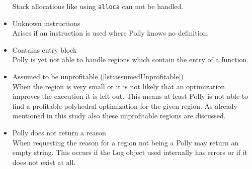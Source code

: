 \begin{itemize}
        Stack allocations like using \texttt{alloca} can not be handled.
    \item Unknown instructions\\
        Arises if an instruction is used where Polly knows no definition.
    \item Contains entry block\\
        Polly is yet not able to handle regions which contain the entry of a function.
    \item Assumed to be unprofitable (\autoref{lst:assumedUnprofitable})\\
        When the region is very small or it is not likely that an optimization improves the execution it is left out.
        This means at least Polly is not able to find a profitable polyhedral optimization for the given region.
        As already mentioned in this study also these unprofitable regions are discussed.
    \item Polly does not return a reason\\
        When requesting the reason for a region not being a \scop Polly may return an empty string.
        This occurs if the Log object used internally has errors or if it does not exist at all.
\end{itemize}

\begin{comment}
    Following is copy\&pasted from pollys ScopDetectionDiagnostic.cpp

SCOP_STAT(CFG, ""),
SCOP_STAT(InvalidTerminator, "Unsupported terminator instruction"),
SCOP_STAT(UnreachableInExit, "Unreachable in exit block"),
SCOP_STAT(IrreducibleRegion, "Irreducible loops"),
SCOP_STAT(LastCFG, ""),
SCOP_STAT(AffFunc, ""),
SCOP_STAT(UndefCond, "Undefined branch condition"),
SCOP_STAT(InvalidCond, "Non-integer branch condition"),
SCOP_STAT(UndefOperand, "Undefined operands in comparison"),
SCOP_STAT(NonAffBranch, "Non-affine branch condition"),
SCOP_STAT(NoBasePtr, "No base pointer"),
SCOP_STAT(UndefBasePtr, "Undefined base pointer"),
SCOP_STAT(VariantBasePtr, "Variant base pointer"),
SCOP_STAT(NonAffineAccess, "Non-affine memory accesses"),
SCOP_STAT(DifferentElementSize, "Accesses with differing sizes"),
SCOP_STAT(LastAffFunc, ""),
SCOP_STAT(LoopBound, "Uncomputable loop bounds"),
SCOP_STAT(LoopHasNoExit, "Loop without exit"),
SCOP_STAT(FuncCall, "Function call with side effects"),
SCOP_STAT(NonSimpleMemoryAccess,
          "Compilated access semantics (volatile or atomic)"),
SCOP_STAT(Alias, "Base address aliasing"),
SCOP_STAT(Other, ""),
SCOP_STAT(IntToPtr, "Integer to pointer conversions"),
SCOP_STAT(Alloca, "Stack allocations"),
SCOP_STAT(UnknownInst, "Unknown Instructions"),
SCOP_STAT(Entry, "Contains entry block"),
SCOP_STAT(Unprofitable, "Assumed to be unprofitable"),
SCOP_STAT(LastOther, "")
\end{comment}

